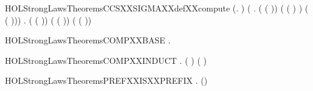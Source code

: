 \newcommand{\HOLStrongLawsTheoremsCCSXXCOMPXXdefXXcompute}{\UseVerbatim{HOLStrongLawsTheoremsCCSXXCOMPXXdefXXcompute}}
\begin{SaveVerbatim}{HOLStrongLawsTheoremsCCSXXSIGMAXXdefXXcompute}
\HOLTokenTurnstile{} (\HOLSymConst{\HOLTokenForall{}}.    \HOLSymConst{=}  ) \HOLSymConst{\HOLTokenConj{}}
   (\HOLSymConst{\HOLTokenForall{}} .
          ( ( )) \HOLSymConst{=}
          ( ( ) \HOLSymConst{\ensuremath{-}} ) \HOLSymConst{\ensuremath{+}}  ( ( ))) \HOLSymConst{\HOLTokenConj{}}
   \HOLSymConst{\HOLTokenForall{}} .
         ( ( )) \HOLSymConst{=}
         ( ( )) \HOLSymConst{\ensuremath{+}}  ( ( ))
\end{SaveVerbatim}
\newcommand{\HOLStrongLawsTheoremsCCSXXSIGMAXXdefXXcompute}{\UseVerbatim{HOLStrongLawsTheoremsCCSXXSIGMAXXdefXXcompute}}
\begin{SaveVerbatim}{HOLStrongLawsTheoremsCOMPXXBASE}
\HOLTokenTurnstile{} \HOLSymConst{\HOLTokenForall{}}.    \HOLSymConst{=}  
\end{SaveVerbatim}
\newcommand{\HOLStrongLawsTheoremsCOMPXXBASE}{\UseVerbatim{HOLStrongLawsTheoremsCOMPXXBASE}}
\begin{SaveVerbatim}{HOLStrongLawsTheoremsCOMPXXINDUCT}
\HOLTokenTurnstile{} \HOLSymConst{\HOLTokenForall{}} .   ( ) \HOLSymConst{=}    \HOLSymConst{\ensuremath{\parallel}}  ( )
\end{SaveVerbatim}
\newcommand{\HOLStrongLawsTheoremsCOMPXXINDUCT}{\UseVerbatim{HOLStrongLawsTheoremsCOMPXXINDUCT}}
\begin{SaveVerbatim}{HOLStrongLawsTheoremsPREFXXISXXPREFIX}
\HOLTokenTurnstile{} \HOLSymConst{\HOLTokenForall{}} .  ()
\end{SaveVerbatim}
